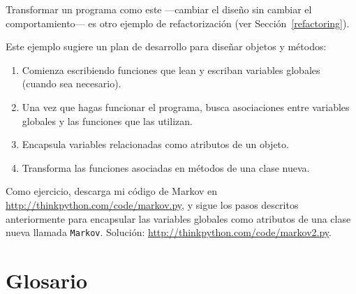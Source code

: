 \documentclass[10pt]{book}
\begin{document}
Transformar un programa como este ---cambiar el diseño sin
cambiar el comportamiento--- es otro ejemplo de refactorización
(ver Sección~\ref{refactoring}).

Este ejemplo sugiere un plan de desarrollo para diseñar objetos y
métodos:

\begin{enumerate}

\item Comienza escribiendo funciones que lean y escriban variables
globales (cuando sea necesario).

\item Una vez que hagas funcionar el programa, busca asociaciones
entre variables globales y las funciones que las utilizan.

\item Encapsula variables relacionadas como atributos de un objeto.

\item Transforma las funciones asociadas en métodos de una clase
nueva.

\end{enumerate}

Como ejercicio, descarga mi código de Markov en
\url{http://thinkpython.com/code/markov.py}, y sigue los pasos
descritos anteriormente para encapsular las variables globales como atributos de una clase
nueva llamada {\tt Markov}.  Solución:
\url{http://thinkpython.com/code/markov2.py}.


\section{Glosario}
\end{document}

